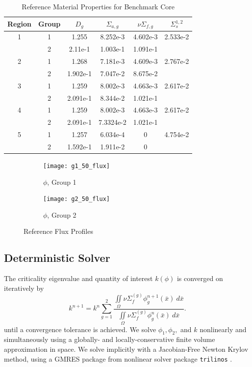 \documentclass{mc2015}
\newcommand{\xs}[2]{\ensuremath{\Sigma_{#1}^{(#2)}}}
\begin{document}
\begin{table}[h]
\centering
\begin{tabular}{c c | c c c c}
Region & Group & $D_g$ & $\Sigma_{a,g}$ & $\nu\Sigma_{f,g}$ & $\Sigma_s^{1,2}$ \\ \hline
1 & 1 & 1.255 & 8.252e-3 & 4.602e-3 & 2.533e-2 \\
 & 2 & 2.11e-1 & 1.003e-1 & 1.091e-1 & \\ \hline
2 & 1 & 1.268 & 7.181e-3 & 4.609e-3 & 2.767e-2 \\
 & 2 & 1.902e-1 & 7.047e-2 & 8.675e-2 & \\ \hline
3 & 1 & 1.259 & 8.002e-3 & 4.663e-3 & 2.617e-2 \\
 & 2 & 2.091e-1 & 8.344e-2 & 1.021e-1 & \\ \hline
4 & 1 & 1.259 & 8.002e-3 & 4.663e-3 & 2.617e-2 \\
 & 2 & 2.091e-1 & 7.3324e-2 & 1.021e-1 & \\ \hline
5 & 1 & 1.257 & 6.034e-4 & 0 & 4.754e-2 \\
 & 2 & 1.592e-1 & 1.911e-2 & 0 & 
\end{tabular}
\caption{Reference Material Properties for Benchmark Core}
\label{tab:coremats}
\end{table}
\begin{figure}[H]
\centering
  \begin{subfigure}[b]{0.45 \textwidth}
   \texttt{[image: g1\_50\_flux]}
   \caption{$\phi$, Group 1}
   \label{g1}
  \end{subfigure}
  \begin{subfigure}[b]{0.45 \textwidth}
   \texttt{[image: g2\_50\_flux]}
   \caption{$\phi$, Group 2}
   \label{g2}
  \end{subfigure}
  \caption{Reference Flux Profiles}
  \label{benchflux}
\end{figure}

\subsection{Deterministic Solver}
The criticality eigenvalue and quantity of interest $k(\phi)$ is converged on iteratively by
\begin{equation}
k^{n+1}=k^n\sum_{g=1}^2\frac{\iint\limits_\Omega\nu\xs{f}{g}\phi_g^{n+1}(\bar x)~d\bar x}{\iint\limits_\Omega\nu\xs{f}{g}\phi_g^{n}(\bar x)~d\bar x}.
\end{equation}
until a convergence tolerance is achieved.  We solve $\phi_1,\phi_2,$ and $k$ nonlinearly and simultaneously using a globally- and locally-conservative finite volume approximation in space.  We solve implicitly with a Jacobian-Free Newton Krylov method, using a GMRES package from nonlinear solver package \texttt{trilinos} \cite{Trilinos-Overview}.\\
\end{document}
